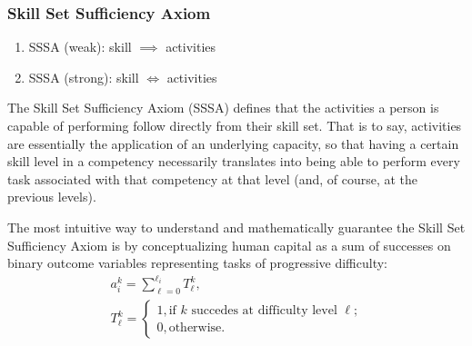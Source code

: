 \documentclass{elsarticle} %
\begin{document}
\subsubsection{Skill Set Sufficiency Axiom}
\begin{enumerate}
    \item SSSA (weak): skill $\implies$ activities
    \item SSSA (strong): skill $\iff$ activities
\end{enumerate}

The Skill Set Sufficiency Axiom (SSSA) defines that the activities a person is capable of performing follow directly from their skill set. That is to say, activities are essentially the application of an underlying capacity, so that having a certain skill level in a competency necessarily translates into being able to perform every task associated with that competency at that level (and, of course, at the previous levels).

The most intuitive way to understand and mathematically guarantee the Skill Set Sufficiency Axiom is by conceptualizing human capital as a sum of successes on binary outcome variables representing tasks of progressive difficulty:
\begin{gather}
    a_{i}^{k} = \sum_{\ell=0}^{\ell_i}T_{\ell}^{k}
    ,\\
    T_{\ell}^{k} = \begin{cases}
        1, \text{if $k$ succedes at difficulty level $\ell$;}\\
        0, \text{otherwise.}
    \end{cases}
\end{gather}
\end{document}
